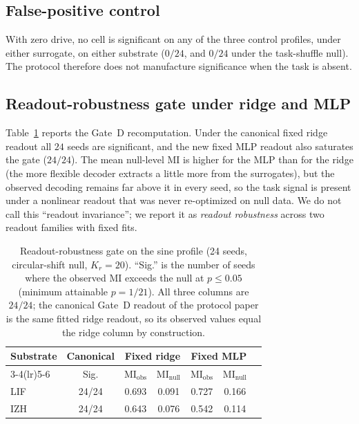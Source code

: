 \documentclass[journal]{IEEEtran}
\newcommand{\MI}{\mathrm{MI}}
\begin{document}
\subsection{False-positive control}
With zero drive, no cell is significant on any of the three control profiles,
under either surrogate, on either substrate ($0/24$, and $0/24$ under the
task-shuffle null). The protocol therefore does not manufacture significance
when the task is absent.

\subsection{Readout-robustness gate under ridge and MLP}
Table~\ref{tab:readout} reports the Gate~D recomputation. Under the canonical
fixed ridge readout all $24$ seeds are significant, and the new fixed MLP readout
also saturates the gate ($24/24$). The mean null-level $\MI$ is higher for the
MLP than for the ridge (the more flexible decoder extracts a little more from the
surrogates), but the observed decoding remains far above it in every seed, so the
task signal is present under a nonlinear readout that was never re-optimized on
null data. We do not call this ``readout invariance''; we report it as
\emph{readout robustness} across two readout families with fixed fits.

\begin{table}[!t]
\caption{Readout-robustness gate on the sine profile (24 seeds, circular-shift
null, $K_r=20$). ``Sig.'' is the number of seeds where the observed $\MI$ exceeds
the null at $p\le0.05$ (minimum attainable $p=1/21$). All three columns are
$24/24$; the canonical Gate~D readout of the protocol paper is the same fitted
ridge readout, so its observed values equal the ridge column by construction.}
\label{tab:readout}
\renewcommand{\arraystretch}{1.05}
\setlength{\tabcolsep}{4.5pt}
\begin{tabular}{@{}lcccccc@{}}
\toprule
Substrate & Canonical & \multicolumn{2}{c}{Fixed ridge} &
\multicolumn{2}{c}{Fixed MLP}\\
\cmidrule(lr){3-4}\cmidrule(lr){5-6}
 & Sig. & $\MI_{\mathrm{obs}}$ & $\MI_{\mathrm{null}}$ &
$\MI_{\mathrm{obs}}$ & $\MI_{\mathrm{null}}$\\
\midrule
LIF & 24/24 & 0.693 & 0.091 & 0.727 & 0.166\\
IZH & 24/24 & 0.643 & 0.076 & 0.542 & 0.114\\
\bottomrule
\end{tabular}
\end{table}
\end{document}
